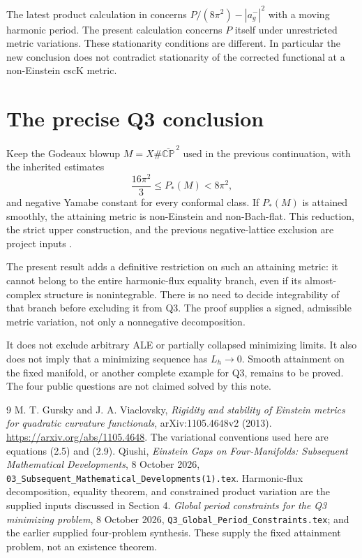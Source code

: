 \documentclass[11pt,a4paper]{article}
\theoremstyle{remark}\newtheorem{remark}[theorem]{Remark}
\newcommand{\CP}{\mathbb{CP}}
\numberwithin{equation}{section}
\begin{document}
The latest product calculation in \cite[Section 4]{Source} concerns
$P/(8\pi^2)-|a_g^-|^2$ with a moving harmonic period. The present
calculation concerns $P$ itself under unrestricted metric variations.
These stationarity conditions are different. In particular the
new conclusion does not contradict stationarity of the corrected
functional at a non-Einstein cscK metric.

\section{The precise Q3 conclusion}
Keep the Godeaux blowup $M=X\#\overline{\CP}^{\,2}$ used in the
previous continuation, with the inherited estimates
\[
  \frac{16\pi^2}{3}\le P_*(M)<8\pi^2,
\]
and negative Yamabe constant for every conformal class. If $P_*(M)$
is attained smoothly, the attaining metric is non-Einstein and
non-Bach-flat. This reduction, the strict upper construction, and the
previous negative-lattice exclusion are project inputs \cite{Prior}.

The present result adds a definitive restriction on such an attaining
metric: it cannot belong to the entire harmonic-flux equality branch,
even if its almost-complex structure is nonintegrable. There is no need
to decide integrability of that branch before excluding it from Q3.
The proof supplies a signed, admissible metric variation, not only a
nonnegative decomposition.

It does not exclude arbitrary ALE or partially collapsed minimizing
limits. It also does not imply that a minimizing sequence has
$L_h\to0$. Smooth attainment on the fixed manifold, or another complete
example for Q3, remains to be proved. The four public questions are not
claimed solved by this note.

\begin{thebibliography}{9}
M. T. Gursky and J. A. Viaclovsky,
\emph{Rigidity and stability of Einstein metrics for quadratic curvature
functionals}, arXiv:1105.4648v2 (2013).
\url{https://arxiv.org/abs/1105.4648}.
The variational conventions used here are equations (2.5) and (2.9).
Qiushi, \emph{Einstein Gaps on Four-Manifolds: Subsequent Mathematical
Developments}, 8 October 2026,
\texttt{03\_Subsequent\_Mathematical\_Developments(1).tex}.
Harmonic-flux decomposition, equality theorem, and constrained product
variation are the supplied inputs discussed in Section 4.
\emph{Global period constraints for the Q3 minimizing problem},
8 October 2026,
\texttt{Q3\_Global\_Period\_Constraints.tex}; and the earlier supplied
four-problem synthesis. These supply the fixed attainment problem, not
an existence theorem.
\end{thebibliography}
\end{document}
